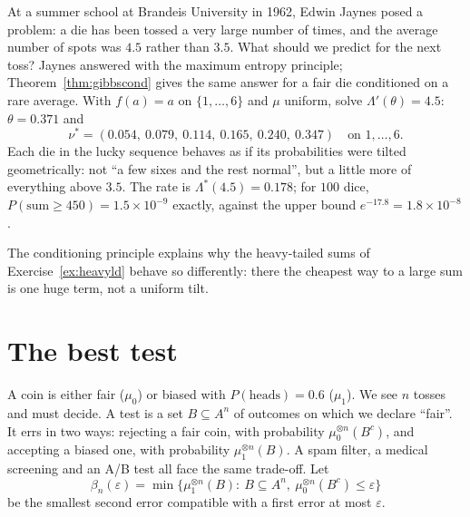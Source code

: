 \begin{example}\label{ex:brandeis}
At a summer school at Brandeis University in 1962, Edwin Jaynes posed a problem: a die has been tossed a very large number of times, and the average number of
spots was $4.5$ rather than $3.5$. What should we predict for the next toss? Jaynes answered with the maximum entropy principle; Theorem~\ref{thm:gibbscond} gives the
same answer for a fair die conditioned on a rare average. With $f(a)=a$ on $\{1,\dots,6\}$ and $\mu$ uniform, solve $\Lambda'(\theta)=4.5$: $\theta=0.371$ and
\[
\nu^*=(0.054,\ 0.079,\ 0.114,\ 0.165,\ 0.240,\ 0.347)\quad\text{on }1,\dots,6.
\]
Each die in the lucky sequence behaves as if its probabilities were tilted geometrically: not ``a few sixes and the rest normal'', but a little more of everything above
$3.5$. The rate is $\Lambda^*(4.5)=0.178$; for $100$ dice, $P(\text{sum}\ge450)=1.5\times10^{-9}$ exactly, against the upper bound $e^{-17.8}=1.8\times10^{-8}$.
\end{example}

The conditioning principle explains why the heavy-tailed sums of Exercise~\ref{ex:heavyld} behave so differently: there the cheapest way to a large sum is one huge
term, not a uniform tilt.

\section{The best test}

A coin is either fair ($\mu_0$) or biased with $P(\text{heads})=0.6$ ($\mu_1$). We see $n$ tosses and must decide. A test is a set $B\subseteq A^n$ of outcomes on which we
declare ``fair''. It errs in two ways: rejecting a fair coin, with probability $\mu_0^{\otimes n}(B^c)$, and accepting a biased one, with probability $\mu_1^{\otimes n}(B)$. A spam filter,
a medical screening and an A/B test all face the same trade-off. Let
\[
\beta_n(\varepsilon)=\min\bigl\{\mu_1^{\otimes n}(B):\ B\subseteq A^n,\ \mu_0^{\otimes n}(B^c)\le\varepsilon\bigr\}
\]
be the smallest second error compatible with a first error at most $\varepsilon$.

